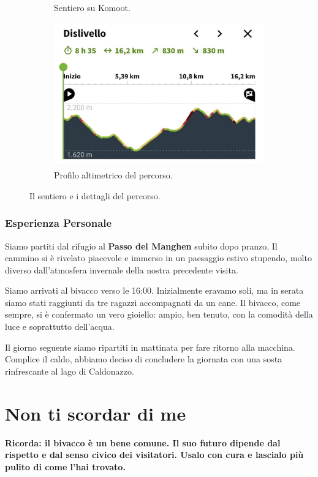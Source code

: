 \documentclass{article}
\begin{document}
\begin{figure}[htbp!]
\begin{subfigure}[t]{0.45\textwidth}
        \caption{Sentiero su Komoot.}
        \label{fig:foto_corta3}
        \vspace{1em} %
        \includegraphics[width=\textwidth]{images/profilo_altimetrico_Giro2.jpg}
        \caption{Profilo altimetrico del percorso.}
        \label{fig:foto_corta4}
    \end{subfigure}
    \caption{Il sentiero e i dettagli del percorso.}
    \label{fig:panoramica_dettagli_giro2}
\end{figure}

\subsubsection{Esperienza Personale}
Siamo partiti dal rifugio al \textbf{Passo del Manghen} subito dopo pranzo. Il cammino si è rivelato piacevole e immerso in un paesaggio estivo stupendo, molto diverso dall’atmosfera invernale della nostra precedente visita.

Siamo arrivati al bivacco verso le 16:00. Inizialmente eravamo soli, ma in serata siamo stati raggiunti da tre ragazzi accompagnati da un cane. Il bivacco, come sempre, si è confermato un vero gioiello: ampio, ben tenuto, con la comodità della luce e soprattutto dell’acqua.

Il giorno seguente siamo ripartiti in mattinata per fare ritorno alla macchina. Complice il caldo, abbiamo deciso di concludere la giornata con una sosta rinfrescante al lago di Caldonazzo.


\section{Non ti scordar di me}
\textbf{\textcolor{BurntOrange}{Ricorda: il bivacco è un bene comune. Il suo futuro dipende dal rispetto e dal senso civico dei visitatori. Usalo con cura e lascialo più pulito di come l'hai trovato.}}
\end{document}
